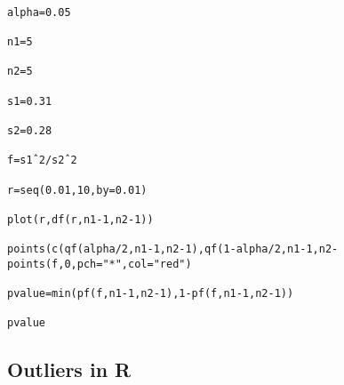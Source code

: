 

 





 







\begin{verbatim}

alpha=0.05

n1=5

n2=5

s1=0.31

s2=0.28

f=s1ˆ2/s2ˆ2

r=seq(0.01,10,by=0.01)

plot(r,df(r,n1-1,n2-1))

points(c(qf(alpha/2,n1-1,n2-1),qf(1-alpha/2,n1-1,n2-points(f,0,pch="*",col="red")

pvalue=min(pf(f,n1-1,n2-1),1-pf(f,n1-1,n2-1))

pvalue

\end{verbatim}



 





 



 





 



\subsection{Outliers in R}

